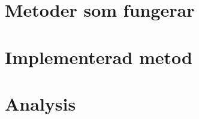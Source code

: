 \section{Metoder som fungerar}





\section{Implementerad metod}









\section{Analysis}

%



